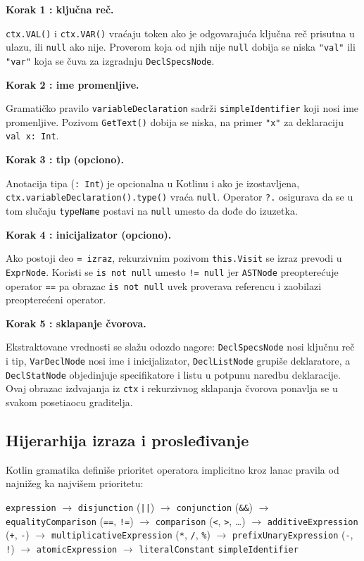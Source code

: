 \documentclass[a4paper]{article}
\begin{document}
\noindent
\textbf{Korak 1 : ključna reč.}

\texttt{ctx.VAL()} i \texttt{ctx.VAR()} vraćaju token ako je odgovarajuća
ključna reč prisutna u ulazu, ili \texttt{null} ako nije.
Proverom koja od njih nije \texttt{null} dobija se niska \texttt{"val"} ili
\texttt{"var"} koja se čuva za izgradnju \texttt{DeclSpecsNode}.

\medskip\noindent
\textbf{Korak 2 : ime promenljive.}

Gramatičko pravilo \texttt{variableDeclaration} sadrži \texttt{simpleIdentifier}
koji nosi ime promenljive. Pozivom \texttt{GetText()} dobija se niska, na primer
\texttt{"x"} za deklaraciju \texttt{val x: Int}.

\medskip\noindent
\textbf{Korak 3 : tip (opciono).}

Anotacija tipa (\texttt{: Int}) je opcionalna u Kotlinu i ako je izostavljena,
\texttt{ctx.variableDeclaration().type()} vraća \texttt{null}. Operator
\texttt{?.} osigurava da se u tom slučaju \texttt{typeName} postavi na
\texttt{null} umesto da dođe do izuzetka.

\medskip\noindent
\textbf{Korak 4 : inicijalizator (opciono).}

Ako postoji deo \texttt{= izraz}, rekurzivnim pozivom \texttt{this.Visit}
se izraz prevodi u \texttt{ExprNode}. Koristi se \texttt{is not null} umesto
\texttt{!= null} jer \texttt{ASTNode} preopterećuje operator \texttt{==} pa
obrazac \texttt{is not null} uvek proverava referencu i zaobilazi preopterećeni
operator.

\medskip\noindent
\textbf{Korak 5 : sklapanje čvorova.}

Ekstraktovane vrednosti se slažu odozdo nagore: \texttt{DeclSpecsNode} nosi
ključnu reč i tip, \texttt{VarDeclNode} nosi ime i inicijalizator,
\texttt{DeclListNode} grupiše deklaratore, a \texttt{DeclStatNode} objedinjuje
specifikatore i listu u potpunu naredbu deklaracije.
Ovaj obrazac izdvajanja iz \texttt{ctx} i rekurzivnog sklapanja čvorova
ponavlja se u svakom posetiaocu graditelja.

\subsection{Hijerarhija izraza i prosleđivanje}

Kotlin gramatika definiše prioritet operatora implicitno kroz lanac pravila
od najnižeg ka najvišem prioritetu:

\begin{center}
\texttt{expression}
$\to$ \texttt{disjunction} (\texttt{||})
$\to$ \texttt{conjunction} (\texttt{\&\&})
$\to$ \texttt{equalityComparison} (\texttt{==}, \texttt{!=})
$\to$ \texttt{comparison} (\texttt{<}, \texttt{>}, \ldots)
$\to$ \texttt{additiveExpression} (\texttt{+}, \texttt{-})
$\to$ \texttt{multiplicativeExpression} (\texttt{*}, \texttt{/}, \texttt{\%})
$\to$ \texttt{prefixUnaryExpression} (\texttt{-}, \texttt{!})
$\to$ \texttt{atomicExpression}
$\to$ \texttt{literalConstant} \textbar{} \texttt{simpleIdentifier}
\end{center}
\end{document}
